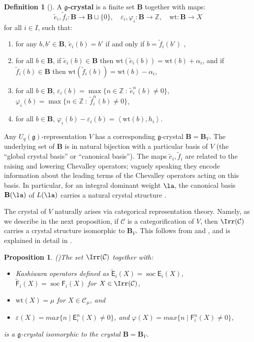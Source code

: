 \documentclass[11pt,reqno]{amsart}
\numberwithin{equation}{section}
\newtheorem{Proposition}[equation]{Proposition}
\theoremstyle{definition}
\newtheorem{Definition}[equation]{Definition}
\theoremstyle{named}
\newcommand{\bB}{\mathbf{B}}
\newcommand{\cC}{\mathcal{C}}
\newcommand{\sE}{\mathsf{E}}
\newcommand{\sF}{\mathsf{F}}
\newcommand{\fg}{\mathfrak{g}}
\newcommand{\ZZ}{\mathbb{Z}}
\renewcommand{\phi}{\varphi}
\newcommand{\eps}{\varepsilon}
\renewcommand{\tilde}[1]{\widetilde{#1}}
\newcommand{\wt}{\text{wt}}
\begin{document}
\begin{Definition} [\cite{Kash90}] A \textbf{$\fg$-crystal} is a finite set $\bB$ together with maps:
	$$\tilde{e}_i,\tilde{f}_i:\bB \rightarrow \bB\sqcup \{0\}, \quad \eps_i,\phi_i : \bB\rightarrow \ZZ, \quad \wt: \bB \rightarrow X$$
	for all $i \in I$, such that:
	\begin{enumerate}
		\item for any $b,b' \in \bB$, $\tilde{e}_i(b)=b'$ if and only if $b=\tilde{f}_i(b')$ ,
		\item for all $b \in \bB$, if $\tilde{e}_i(b) \in \bB$ then $\wt(\tilde{e}_i(b))=\wt(b)+\alpha_i$, and if $\tilde{f}_i(b) \in \bB$ then $\wt(\tilde{f}_i(b))=\wt(b)-\alpha_i$,
		\item for all $b \in \bB$, $\eps_i(b)=\max\{n \in \ZZ~:~\tilde{e}^n_i(b) \neq 0\}$, $\phi_i(b)=\max\{n \in \ZZ~:~\tilde{f}^n_i(b)\neq 0\}$,
		\item for all $b \in \bB$, $\phi_i(b)-\eps_i(b)=\left\langle \wt(b),h_i\right\rangle$.
	\end{enumerate}
\end{Definition}

Any $U_q(\fg)$-representation $V$ has a corresponding $\fg$-crystal $\bB=\bB_V$.  The underlying set of $\bB$ is in natural bijection with a particular basis of $V$ (the ``global crystal basis'' or ``canonical basis'').  The maps $\tilde{e}_i,\tilde{f}_i$ are related to the raising and lowering Chevalley operators; vaguely speaking they encode information about the leading terms of the Chevalley operators acting on this basis. In particular, for an integral dominant weight $\la$, the canonical basis $\bB(\la)$ of $L(\la)$ carries a natural crystal structure \cite{GL92}.

The crystal  of $V$ naturally arises via categorical representation theory. Namely, as we describe in the next proposition, if $\cC$ is a categorification of $V$, then $\Irr(\cC)$ carries a crystal structure isomorphic to $\bB_V$. This follows  from \cite[Proposition 5.20]{CR} and \cite{LV}, and is explained in detail in \cite{BDcryst}.  

\begin{Proposition}(\cite[Theorem 4.31]{BDcryst})\label{prop:cryst}
	The set $\Irr(\cC)$ together with:
	\begin{itemize}
	 \item Kashiwara operators defined as $\widetilde{\sE}_i(X)=\operatorname{soc}{\sE_i(X)}$, $\widetilde{\sF}_i(X)=\operatorname{soc}{\sF_i(X)}$ for $X \in \Irr(\cC)$, 
	 \item $\wt(X) = \mu$ for $X \in \cC_\mu$, and
	 \item $\varepsilon(X)=max\{ n \;|\; \sE_i^n(X)\neq 0\}$, and $\varphi(X)=max\{ n \;|\; \sF_i^n(X)\neq 0\}$,
	 \end{itemize}
	  is a $\fg$-crystal isomorphic to the crystal $\bB=\bB_V$.
\end{Proposition}
\end{document}
